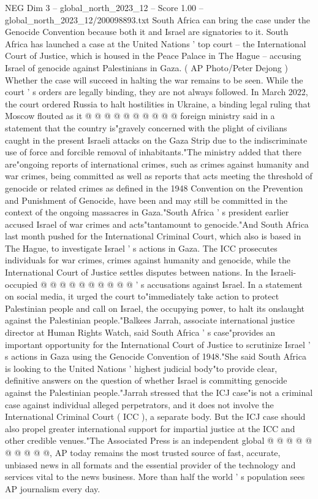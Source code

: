 \begin{textsample}{NEG Dim 3 – global\_north\_2023\_12 – Score 1.00 – global\_north\_2023\_12/200098893.txt}
South Africa can bring the case under the Genocide Convention because both it and Israel are signatories to it.
South Africa has launched a case at the United Nations ' top court -- the International Court of Justice, which is housed in the Peace Palace in The Hague -- accusing Israel of genocide against Palestinians in Gaza. ( AP Photo/Peter Dejong ) Whether the case will succeed in halting the war remains to be seen.
While the court ' s orders are legally binding, they are not always followed.
In March 2022, the court ordered Russia to halt hostilities in Ukraine, a binding legal ruling that Moscow flouted as it @ @ @ @ @ @ @ @ @ @ foreign ministry said in a statement that the country is"gravely concerned with the plight of civilians caught in the present Israeli attacks on the Gaza Strip due to the indiscriminate use of force and forcible removal of inhabitants."The ministry added that there are"ongoing reports of international crimes, such as crimes against humanity and war crimes, being committed as well as reports that acts meeting the threshold of genocide or related crimes as defined in the 1948 Convention on the Prevention and Punishment of Genocide, have been and may still be committed in the context of the ongoing massacres in Gaza."South Africa ' s president earlier accused Israel of war crimes and acts"tantamount to genocide."And South Africa last month pushed for the International Criminal Court, which also is based in The Hague, to investigate Israel ' s actions in Gaza.
The ICC prosecutes individuals for war crimes, crimes against humanity and genocide, while the International Court of Justice settles disputes between nations.
In the Israeli-occupied @ @ @ @ @ @ @ @ @ @ ' s accusations against Israel.
In a statement on social media, it urged the court to"immediately take action to protect Palestinian people and call on Israel, the occupying power, to halt its onslaught against the Palestinian people."Balkees Jarrah, associate international justice director at Human Rights Watch, said South Africa ' s case"provides an important opportunity for the International Court of Justice to scrutinize Israel ' s actions in Gaza using the Genocide Convention of 1948."She said South Africa is looking to the United Nations ' highest judicial body"to provide clear, definitive answers on the question of whether Israel is committing genocide against the Palestinian people."Jarrah stressed that the ICJ case"is not a criminal case against individual alleged perpetrators, and it does not involve the International Criminal Court ( ICC ), a separate body.
But the ICJ case should also propel greater international support for impartial justice at the ICC and other credible venues."The Associated Press is an independent global @ @ @ @ @ @ @ @ @ @, AP today remains the most trusted source of fast, accurate, unbiased news in all formats and the essential provider of the technology and services vital to the news business.
More than half the world ' s population sees AP journalism every day.

\end{textsample}
